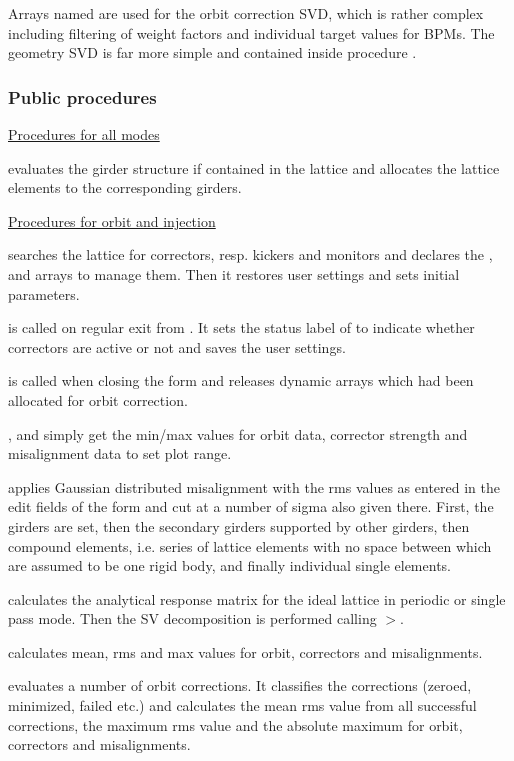 \documentclass[12pt]{article}
\newcommand\code[1]{{\tt #1}}
\newcommand{\unico}[1]{{\color{burntorange}\code{#1}}}
\newcommand{\prcod}[2]{\opauni{#1}$>$\unico{#2}}
\newcommand{\opagui}[1]{\colorbox{blue!20}{{\color{black}\code{#1}}}}
\newcommand{\ogui}[1]{\hyperref[#1]{\opagui{#1}}}
\newcommand{\opauni}[1]{\colorbox{orange!30}{{\color{black}\code{#1}}}}
\newcommand{\ppro}[1]{\subsubsection*{Public procedures} #1}
\begin{document}
Arrays named \unico{oco\dots} are used for the orbit correction SVD, which is rather complex including filtering of weight factors and individual target values for BPMs. The geometry SVD is far more simple and contained inside procedure \unico{gmat\_step}.


\ppro{}

\underline{Procedures for all modes}

\unico{GirderSetup} evaluates the girder structure if contained in the lattice and allocates the lattice elements to the corresponding girders.

\underline{Procedures for orbit and injection}

\unico{OrbitInit} searches the lattice for correctors, resp. kickers and monitors and declares the \unico{cor}, \unico{bpm} and \unico{kick} arrays to manage them. Then it restores user settings and sets initial parameters.

\unico{OrbitExit} is called on regular exit from \ogui{opaorbit}. It sets the status label of \ogui{opamenu} to indicate whether correctors are active or not and saves the user settings.

\unico{OrbitClose} is called when closing the \ogui{opaorbit} form and releases dynamic arrays which had been allocated for orbit correction.


\unico{GetOrbitMax}, \unico{GetCorMax} and \unico{GetMisMax} simply get the min/max values for orbit data, corrector strength and misalignment data to set plot range.

\unico{setMisalignments} applies Gaussian distributed misalignment with the rms values as entered in the edit fields of the \ogui{opaorbit} form and cut at a number of sigma also given there. First, the girders are set, then the secondary girders supported by other girders, then compound elements, i.e. series of lattice elements with no space between which are assumed to be one rigid body, and finally individual single elements.

\unico{GetResponseMatrix} calculates the analytical response matrix for the ideal lattice in periodic or single pass mode. Then the SV decomposition is performed calling \prcod{mathlib}{SVDCMP}.

\unico{CodstatCalc} calculates mean, rms and max values for orbit, correctors and misalignments.

\unico{LoopstatCalc} evaluates a number of orbit corrections. It classifies the corrections (zeroed, minimized, failed etc.) and calculates the mean rms value from all successful corrections, the maximum rms value and the absolute maximum for orbit, correctors and misalignments.  
\end{document}
